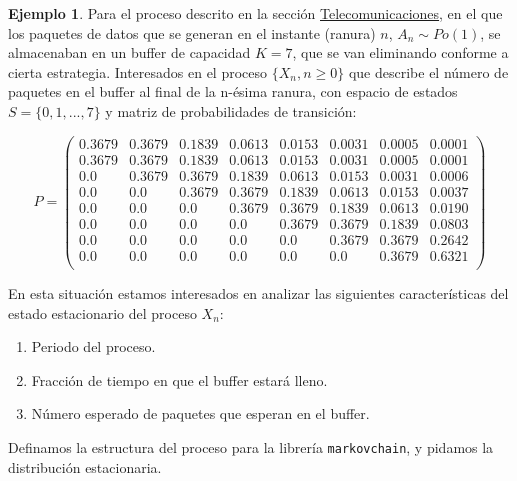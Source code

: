 \documentclass[
]{book}
\providecommand{\tightlist}{%
  \setlength{\itemsep}{0pt}\setlength{\parskip}{0pt}}
\theoremstyle{definition}
\theoremstyle{definition}
\newtheorem{example}{Ejemplo}[chapter]
\theoremstyle{definition}
\theoremstyle{definition}
\theoremstyle{remark}
\begin{document}
\begin{example}

Para el proceso descrito en la sección \protect\hyperlink{telecomunicaciones}{Telecomunicaciones}, en el que los paquetes de datos que se generan en el instante (ranura) \(n\), \(A_n \sim Po(1)\), se almacenaban en un buffer de capacidad \(K=7\), que se van eliminando conforme a cierta estrategia. Interesados en el proceso \(\{X_n, n\geq 0\}\) que describe el número de paquetes en el buffer al final de la n-ésima ranura, con espacio de estados \(S=\{0, 1,..., 7\}\) y matriz de probabilidades de transición:

\[P = 
\begin{pmatrix}
0.3679 & 0.3679 & 0.1839 & 0.0613 & 0.0153 & 0.0031 & 0.0005 & 0.0001\\
0.3679 & 0.3679 & 0.1839 & 0.0613 & 0.0153 & 0.0031 & 0.0005 & 0.0001\\
0.0 & 0.3679 & 0.3679 & 0.1839 & 0.0613 & 0.0153 & 0.0031 & 0.0006\\
0.0 & 0.0 & 0.3679 & 0.3679 & 0.1839 & 0.0613 & 0.0153 & 0.0037\\
0.0 & 0.0 & 0.0& 0.3679 & 0.3679 & 0.1839 & 0.0613 & 0.0190\\
0.0 & 0.0 & 0.0& 0.0& 0.3679 & 0.3679 & 0.1839 & 0.0803\\
0.0 & 0.0 & 0.0& 0.0& 0.0& 0.3679 & 0.3679 & 0.2642\\
0.0 & 0.0 & 0.0& 0.0& 0.0& 0.0& 0.3679 & 0.6321\\
\end{pmatrix}\]

En esta situación estamos interesados en analizar las siguientes características del estado estacionario del proceso \(X_n\):

\begin{enumerate}
\def\labelenumi{\arabic{enumi}.}
\tightlist
\item
  Periodo del proceso.
\item
  Fracción de tiempo en que el buffer estará lleno.
\item
  Número esperado de paquetes que esperan en el buffer.
\end{enumerate}

\end{example}

Definamos la estructura del proceso para la librería \texttt{markovchain}, y pidamos la distribución estacionaria.
\end{document}
